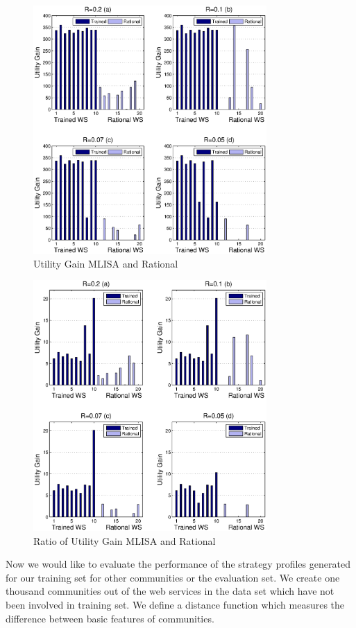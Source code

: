 \documentclass[10pt,journal,cspaper,compsoc]{IEEEtran}
\begin{document}
\begin{figure}%
\centering
\includegraphics[width=3.5in]{figures/utility_gain.eps}
\caption{Utility Gain MLISA and Rational}
\label{utility_gain_mlisa_and_rational}
\end{figure}

\begin{figure}%
\centering
\includegraphics[width=3.5in]{figures/utility_ratio.eps}
\caption{Ratio of Utility Gain MLISA and Rational}
\label{utility_gain_mlisa_and_rational_ratio}
\end{figure}

Now we would like to evaluate the performance of the strategy profiles generated for our training set for other communities or the evaluation set. We create one thousand communities out of the web services in the data set which have not been involved in training set. We define a distance function which measures the difference between basic features of communities.
\end{document}

